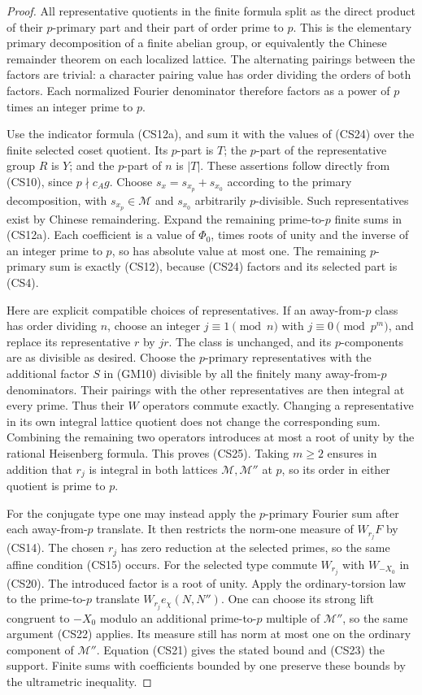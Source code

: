 \begin{proof}
All representative quotients in the finite formula split
as the direct product of their $p$-primary part and their
part of order prime to $p$.  This is the elementary primary
decomposition of a finite abelian group, or equivalently
the Chinese remainder theorem on each localized lattice.
The alternating pairings between the factors are trivial:
a character pairing value has order dividing the orders
of both factors.  Each normalized Fourier denominator
therefore factors as a power of $p$ times an integer prime
to $p$.

Use the indicator formula (CS12a), and sum it with the
values of (CS24) over the finite selected coset quotient.
Its $p$-part is $T$; the $p$-part of the representative
group $R$ is $Y$; and the $p$-part of $n$ is $|T|$.
These assertions follow directly from (CS10), since
$p\nmid c_Ag$.  Choose $s_x=s_{x_p}+s_{x_0}$ according
to the primary decomposition, with $s_{x_p}\in\mathcal M$
and $s_{x_0}$ arbitrarily $p$-divisible.  Such representatives
exist by Chinese remaindering.  Expand the remaining
prime-to-$p$ finite sums in (CS12a).  Each coefficient is
a value of $\Phi_0$, times roots of unity and the inverse
of an integer prime to $p$, so has absolute value at most
one.  The remaining $p$-primary sum is exactly (CS12),
because (CS24) factors and its selected part is (CS4).

Here are explicit compatible choices of representatives.
If an away-from-$p$ class has order dividing $n$, choose
an integer $j\equiv1\pmod n$ with $j\equiv0\pmod{p^m}$,
and replace its representative $r$ by $jr$.
The class is unchanged, and its $p$-components are as
divisible as desired.  Choose the $p$-primary representatives
with the additional factor $S$ in (GM10) divisible by all
the finitely many away-from-$p$ denominators.  Their
pairings with the other representatives are then integral
at every prime.  Thus their $W$ operators commute exactly.
Changing a representative in its own integral lattice
quotient does not change the corresponding sum.  Combining
the remaining two operators introduces at most a root of
unity by the rational Heisenberg formula.  This proves
(CS25).  Taking $m\ge2$ ensures in addition that $r_j$
is integral in both lattices $\mathcal M,\mathcal M''$
at $p$, so its order in either quotient is prime to $p$.

For the conjugate type one may instead apply the $p$-primary
Fourier sum after each away-from-$p$ translate.  It then
restricts the norm-one measure of $W_{r_j}F$ by (CS14).
The chosen $r_j$ has zero reduction at the selected primes,
so the same affine condition (CS15) occurs.
For the selected type commute $W_{r_j}$ with $W_{-X_0}$
in (CS20).  The introduced factor is a root of unity.
Apply the ordinary-torsion law to the prime-to-$p$ translate
$W_{r_j}e_\chi(N,N'')$.  One can choose its strong lift
congruent to $-X_0$ modulo an additional prime-to-$p$
multiple of $\mathcal M''$, so the same argument (CS22)
applies.  Its measure still has norm at most one on the
ordinary component of $\mathcal M''$.
Equation (CS21) gives the stated bound and (CS23) the
support.  Finite sums with coefficients bounded by one
preserve these bounds by the ultrametric inequality.
\end{proof}
